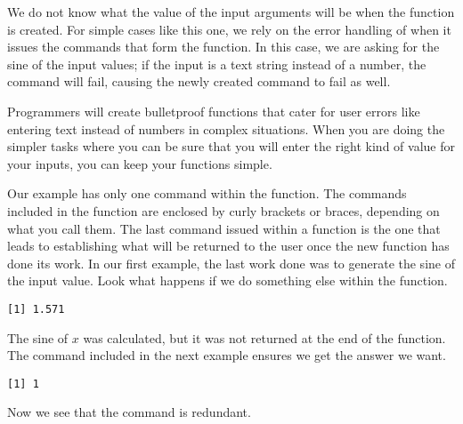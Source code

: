 We do not know what the value of the input arguments will be when the function is created. For simple cases like this one, we rely on the error handling of \R{} when it issues the commands that form the function. In this case, we are asking for the sine of the input values; if the input is a text string instead of a number, the  command will fail, causing the newly created  command to fail as well. 
 
Programmers will create bulletproof functions that cater for user errors like entering text instead of numbers in complex situations. When you are doing the simpler tasks where you can be sure that you will enter the right kind of value for your inputs, you can keep your functions simple. 
 
Our example has only one command within the function. The commands included in the function are enclosed by curly brackets or braces, depending on what you call them. The last command issued within a function is the one that leads to establishing what will be returned to the user once the new function has done its work. In our first example, the last work done was to generate the sine of the input value. Look what happens if we do something else within the function. 
\begin{knitrout}
\color{fgcolor}\begin{kframe}
\begin{alltt}
\hlstd{> } \hlkwb{<-} \hlstd{(}\hlstd{)\{} 
\hlstd{   }
\hlstd{> }\hlopt{/}\hlstd{)}
\end{alltt}
\begin{verbatim}
[1] 1.571
\end{verbatim}
\end{kframe}
\end{knitrout}
The sine of $x$ was calculated, but it was not returned at the end of the function. 
The  command included in the next example ensures we get the answer we want. 
\begin{knitrout}
\color{fgcolor}\begin{kframe}
\begin{alltt}
\hlstd{> } \hlkwb{<-} \hlstd{(}\hlstd{)\{} \hlstd{(}
\hlstd{   }
\hlstd{> }\hlopt{/}\hlstd{)}
\end{alltt}
\begin{verbatim}
[1] 1
\end{verbatim}
\end{kframe}
\end{knitrout}
Now we see that the  command is redundant. 
 
 
 


